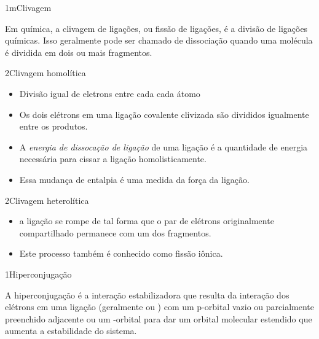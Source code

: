 \documentclass[\mainfilename]{subfiles}
\begin{document}
\begin{sectionBox}1m{Clivagem} %
    
    Em química, a clivagem de ligações, ou fissão de ligações, é a divisão de ligações químicas. Isso geralmente pode ser chamado de dissociação quando uma molécula é dividida em dois ou mais fragmentos.

    \begin{sectionBox}2{Clivagem homolítica} %
        
        \begin{itemize}
            \item Divisão igual de eletrons entre cada cada átomo
            \item Os dois elétrons em uma ligação covalente clivizada são divididos igualmente entre os produtos. 
            \item A \textit{energia de dissocação de ligação} de uma ligação é a quantidade de energia necessária para cissar a ligação homolisticamente.
            \item Essa mudança de entalpia é uma medida da força da ligação.
        \end{itemize}
    \end{sectionBox}

    \begin{sectionBox}2{Clivagem heterolítica} %
        
        \begin{itemize}
            \item a ligação se rompe de tal forma que o par de elétrons originalmente compartilhado permanece com um dos fragmentos.
            \item Este processo também é conhecido como fissão iônica.
        \end{itemize}

    \end{sectionBox}
    
\end{sectionBox}

\begin{sectionBox}1{Hiperconjugação} %
    
    A hiperconjugação é a interação estabilizadora que resulta da interação dos elétrons em uma ligação \chemsigma{} (geralmente  ou ) com um p-orbital vazio ou parcialmente preenchido adjacente ou um \chempi-orbital para dar um orbital molecular estendido que aumenta a estabilidade do sistema.
    
\end{sectionBox}
\end{document}
